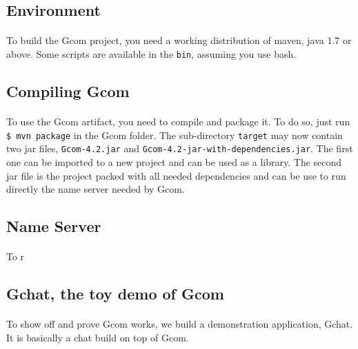 \subsection{Environment}
\paragraph{}{
    To build the Gcom project, you need a working distribution of maven, java
 1.7 or above. Some scripts are available in the \texttt{bin}, assuming
 you use bash.
}


\subsection{Compiling Gcom}
\paragraph{}{
    To use the Gcom artifact, you need to compile and package it. To do so,
 just run \texttt{\$ mvn package} in the Gcom folder. The sub-directory
 \texttt{target} may now contain two jar files, \texttt{Gcom-4.2.jar} and
 \texttt{Gcom-4.2-jar-with-dependencies.jar}. The first one can be imported
 to a new project and can be used as a library. The second jar file is the 
 project packed with all needed dependencies and can be use to run directly
 the name server needed by Gcom.
}

\subsection{Name Server}
\paragraph{}{
    To r
}

\subsection{Gchat, the toy demo of Gcom}
\paragraph{}{
    To show off and prove Gcom works, we build a demonstration application,
 Gchat. It is basically a chat build on top of Gcom.
}

